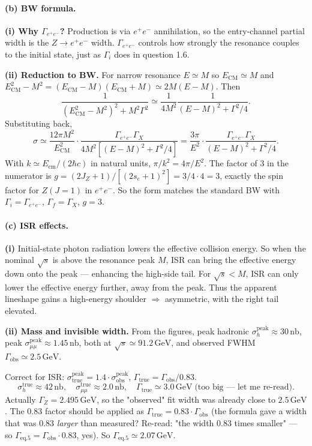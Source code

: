 \documentclass[11pt]{article}
\newcommand{\GeV}{\,\mathrm{GeV}}
\begin{document}
\paragraph{(b) BW formula.}

\textbf{(i) Why $\Gamma_{e^+e^-}$?} Production is via $e^+e^-$ annihilation, so the entry-channel partial width is the $Z\to e^+e^-$ width. $\Gamma_{e^+e^-}$ controls how strongly the resonance couples to the initial state, just as $\Gamma_i$ does in question 1.6.

\textbf{(ii) Reduction to BW.} For narrow resonance $E\simeq M$ so $E_\mathrm{CM}\simeq M$ and $E_\mathrm{CM}^{2}-M^{2}=(E_\mathrm{CM}-M)(E_\mathrm{CM}+M)\simeq 2M(E-M)$. Then
\[
\frac{1}{(E_\mathrm{CM}^{2}-M^{2})^{2}+M^{2}\Gamma^{2}}\simeq\frac{1}{4M^{2}}\frac{1}{(E-M)^{2}+\Gamma^{2}/4}.
\]
Substituting back,
\[
\sigma\simeq\frac{12\pi M^{2}}{E_\mathrm{CM}^{2}}\cdot\frac{\Gamma_{e^+e^-}\Gamma_X}{4M^{2}\!\left[(E-M)^{2}+\Gamma^{2}/4\right]}=\frac{3\pi}{E^{2}}\cdot\frac{\Gamma_{e^+e^-}\Gamma_X}{(E-M)^{2}+\Gamma^{2}/4}.
\]
With $k\simeq E_\mathrm{cm}/(2\hbar c)$ in natural units, $\pi/k^{2}=4\pi/E^{2}$. The factor of 3 in the numerator is $g=(2J_Z+1)/[(2s_e+1)^{2}]=3/4\cdot 4=3$, exactly the spin factor for $Z(J=1)$ in $e^+e^-$. So the form matches the standard BW with $\Gamma_i=\Gamma_{e^+e^-}$, $\Gamma_f=\Gamma_X$, $g=3$. \checkmark

\paragraph{(c) ISR effects.}

\textbf{(i)} Initial-state photon radiation lowers the effective collision energy. So when the nominal $\sqrt{s}$ is above the resonance peak $M$, ISR can bring the effective energy down onto the peak --- enhancing the high-side tail. For $\sqrt{s}<M$, ISR can only lower the effective energy further, away from the peak. Thus the apparent lineshape gains a high-energy shoulder $\Rightarrow$ asymmetric, with the right tail elevated.

\textbf{(ii) Mass and invisible width.} From the figures, peak hadronic $\sigma_h^\mathrm{peak}\approx 30\,\mathrm{nb}$, peak $\sigma_{\mu\mu}^\mathrm{peak}\approx 1.45\,\mathrm{nb}$, both at $\sqrt{s}\simeq 91.2\GeV$, and observed FWHM $\Gamma_\mathrm{obs}\simeq 2.5\GeV$.

Correct for ISR: $\sigma_\mathrm{true}^\mathrm{peak}=1.4\cdot\sigma_\mathrm{obs}^\mathrm{peak}$, $\Gamma_\mathrm{true}=\Gamma_\mathrm{obs}/0.83$.
\[
\sigma_h^\mathrm{true}\approx 42\,\mathrm{nb},\quad\sigma_{\mu\mu}^\mathrm{true}\approx 2.0\,\mathrm{nb},\quad\Gamma_\mathrm{true}\simeq 3.0\GeV \;\text{(too big — let me re-read)}.
\]
Actually $\Gamma_Z=2.495\GeV$, so the "observed" fit width was already close to $2.5\GeV$. The 0.83 factor should be applied as $\Gamma_\mathrm{true}=0.83\cdot\Gamma_\mathrm{obs}$ (the formula gave a width that was 0.83 \emph{larger} than measured? Re-read: "the width 0.83 times smaller" --- so $\Gamma_\mathrm{eq.5}=\Gamma_\mathrm{obs}\cdot 0.83$, yes). So $\Gamma_\mathrm{eq.5}\simeq 2.07\GeV$.
\end{document}
